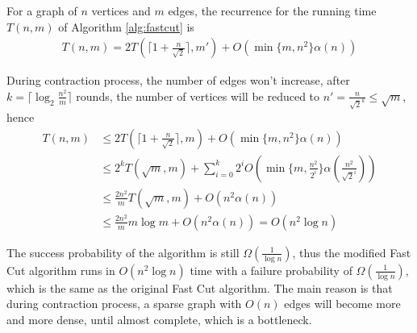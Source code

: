 \documentclass[11pt]{article}
\theoremstyle{plain}
\begin{document}


For a graph of $n$ vertices and $m$ edges, the recurrence for the running time $T(n,m)$ of Algorithm \ref{alg:fastcut} is
\begin{align*}
    T(n,m)=2T\left(\lceil 1+\frac{n}{\sqrt{2}}\rceil,m'\right)+O(\min\{m,n^2\}\alpha(n))
\end{align*}

During contraction process, the number of edges won't increase, after $k=\lceil \log_2\frac{n^2}{m}\rceil$ rounds, the number of vertices will be reduced to $n'=\frac{n}{\sqrt{2}^k}\leq \sqrt{m}$, hence
\begin{align*}
    T(n,m)&\leq 2T\left(\lceil 1+\frac{n}{\sqrt{2}}\rceil,m\right)+O(\min\{m,n^2\}\alpha(n))\\
    &\leq 2^{k}T(\sqrt{m}, m)+\sum_{i=0}^{k} 2^{i}O(\min\{m,\frac{n^2}{2^i}\}\alpha(\frac{n^2}{\sqrt{2}^i}))\\
    &\leq\frac{2n^2}{m}T(\sqrt{m},m)+O(n^2\alpha(n))\\
    &\leq \frac{2n^2}{m}m\log m+O(n^2\alpha(n))=O(n^2\log n)
\end{align*}

The success probability of the algorithm is still $\Omega(\frac{1}{\log n})$, thus the modified Fast Cut algorithm runs in $O(n^2\log n)$ time with a failure probability of $\Omega(\frac{1}{\log n})$, which is the same as the original Fast Cut algorithm. The main reason is that during contraction process, a sparse graph with $O(n)$ edges will become more and more dense, until almost complete, which is a bottleneck.
\end{document}
